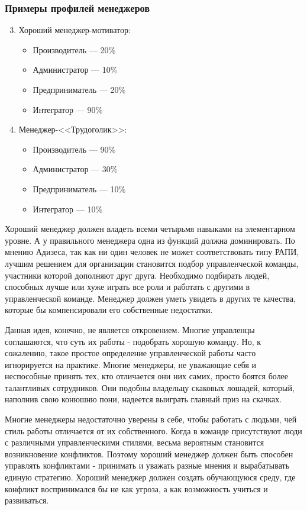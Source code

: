 \documentclass{../industrial-development}
\begin{document}
\begin{frame} \frametitle{Примеры профилей менеджеров }
	\begin{enumerate}
\setcounter{enumi}{2}
\item Хороший менеджер-мотиватор:
		 \begin{itemize}
                     \item Производитель — 20\%
 		 \item Администратор — 10\%
 		 \item Предприниматель — 20\%
		\item Интегратор — 90\%
		\end{itemize} 
\item Менеджер-<<Трудоголик>>:	
		 \begin{itemize}
                         \item Производитель — 90\%
 		 \item Администратор — 30\%
 		 \item Предприниматель — 10\%
		\item Интегратор — 10\%
		\end{itemize} 
\end{enumerate}
\end{frame}
\lecturenotes
Хороший менеджер должен владеть всеми четырьмя навыками на элементарном уровне. А у правильного менеджера одна из функций должна доминировать.
По мнению Адизеса, так как ни один человек не может соответствовать типу РАПИ, лучшим решением для организации становится подбор управленческой команды, участники которой дополняют друг друга. Необходимо подбирать людей, способных лучше или хуже играть все роли и работать с другими в управленческой команде. Менеджер должен уметь увидеть в других те качества, которые бы компенсировали его собственные недостатки.

Данная идея, конечно, не является откровением. Многие управленцы соглашаются, что суть их работы - подобрать хорошую команду. Но, к сожалению, такое простое определение управленческой работы часто игнорируется на практике. Многие менеджеры, не уважающие себя и неспособные принять тех, кто отличается они них самих, просто боятся более талантливых сотрудников. Они подобны владельцу скаковых лошадей, который, наполнив свою конюшню пони, надеется выиграть главный приз на скачках.

Многие менеджеры недостаточно уверены в себе, чтобы работать с людьми, чей стиль работы отличается от их собственного. Когда в команде присутствуют люди с различными управленческими стилями, весьма вероятным становится возникновение конфликтов. Поэтому хороший менеджер должен быть способен управлять конфликтами - принимать и уважать разные мнения и вырабатывать единую стратегию. Хороший менеджер должен создать обучающуюся среду, где конфликт воспринимался бы не как угроза, а как возможность учиться и развиваться.
\end{document}
